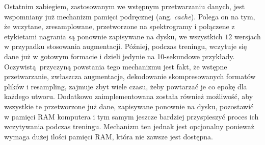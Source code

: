 Ostatnim zabiegiem, zastosowanym we wstępnym przetwarzaniu danych, jest wspomniany już mechanizm
pamięci podręcznej (ang. \emph{cache}). Polega on na tym, że wczytane, zresamplowane, przetworzone
na spektrogramy i połączene z etykietami nagrania są ponownie zapisywane na dysku, we wszystkich $12$
wersjach w przypadku stosowania augmentacji. Później, podczas treningu, wczytuje się dane już w
gotowym formacie i dzieli jedynie na 10-sekundowe przykłady. Oczywistą przyczyną powstania tego
mechanizmu jest fakt, że wstępne przetwarzanie, zwłaszcza augmentacje, dekodowanie skompresowanych
formatów plików i resampling, zajmuje zbyt wiele czasu, żeby powtarzać je co epokę dla każdego
utworu. Dodatkowo zaimplementowana została również możliwość, aby wszystkie te przetworzone już
dane, zapisywane ponownie na dysku, pozostawić w pamięci RAM komputera i tym samym jeszcze bardziej
przyspieszyć proces ich wczytywania podczas treningu. Mechanizm ten jednak jest opcjonalny ponieważ
wymaga dużej ilości pamięci RAM, która nie zawsze jest dostępna.

